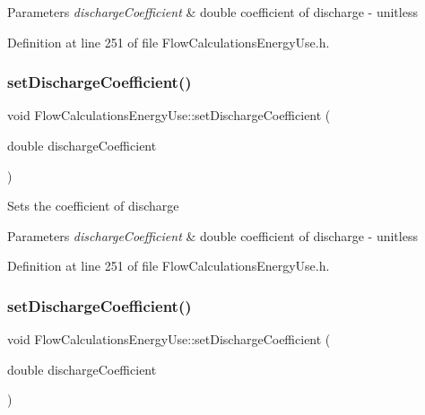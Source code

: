 \begin{DoxyParams}{Parameters}
{\em discharge\+Coefficient} & double coefficient of discharge -\/ unitless \\
\hline
\end{DoxyParams}


Definition at line 251 of file Flow\+Calculations\+Energy\+Use.\+h.

\mbox{\label{class_flow_calculations_energy_use_aaa0b642f4cb22b3b74acd8a5d473a107}} 
\subsubsection{\texorpdfstring{set\+Discharge\+Coefficient()}{setDischargeCoefficient()}\hspace{0.1cm}{\footnotesize\ttfamily [2/3]}}
{\footnotesize\ttfamily void Flow\+Calculations\+Energy\+Use\+::set\+Discharge\+Coefficient (\begin{DoxyParamCaption}\item[{double}]{discharge\+Coefficient }\end{DoxyParamCaption})\hspace{0.3cm}{\ttfamily [inline]}}

Sets the coefficient of discharge


\begin{DoxyParams}{Parameters}
{\em discharge\+Coefficient} & double coefficient of discharge -\/ unitless \\
\hline
\end{DoxyParams}


Definition at line 251 of file Flow\+Calculations\+Energy\+Use.\+h.

\mbox{\label{class_flow_calculations_energy_use_aaa0b642f4cb22b3b74acd8a5d473a107}} 
\subsubsection{\texorpdfstring{set\+Discharge\+Coefficient()}{setDischargeCoefficient()}\hspace{0.1cm}{\footnotesize\ttfamily [3/3]}}
{\footnotesize\ttfamily void Flow\+Calculations\+Energy\+Use\+::set\+Discharge\+Coefficient (\begin{DoxyParamCaption}\item[{double}]{discharge\+Coefficient }\end{DoxyParamCaption})\hspace{0.3cm}{\ttfamily [inline]}}

